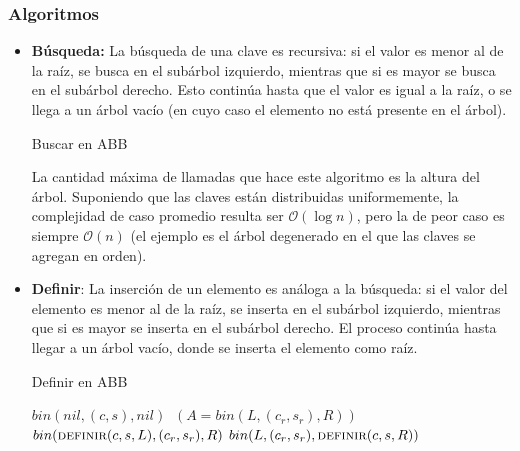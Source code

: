 \documentclass{article}
\newcommand{\BigO}[1]{{\mathcal{O}(#1)}}
\begin{document}
\subsubsection{Algoritmos}

\begin{itemize}
    \item \textbf{Búsqueda:} La búsqueda de una clave es recursiva: si el valor es menor al de la raíz, se busca en el subárbol izquierdo, mientras que si es mayor se busca en el subárbol derecho. Esto continúa hasta que el valor es igual a la raíz, o se llega a un árbol vacío (en cuyo caso el elemento no está presente en el árbol).
          \begin{algorithm}[H]
              \caption*{Buscar en ABB}\label{alg-abb-buscar}

          \end{algorithm}

          La cantidad máxima de llamadas que hace este algoritmo es la altura del árbol. Suponiendo que las claves están distribuidas uniformemente, la complejidad de caso promedio resulta ser $\BigO{}$, pero la de peor caso es siempre $\BigO{n}$ (el ejemplo es el árbol degenerado en el que las claves se agregan en orden).

    \item \textbf{Definir}: La inserción de un elemento es análoga a la búsqueda: si el valor del elemento es menor al de la raíz, se inserta en el subárbol izquierdo, mientras que si es mayor se inserta en el subárbol derecho. El proceso continúa hasta llegar a un árbol vacío, donde se inserta el elemento como raíz.
          \begin{algorithm}[H]
              \caption*{Definir en ABB}\label{alg-abb-definir}
              \begin{algorithmic}
                  \State \Return $bin(nil, (c, s), nil)$
                  \Else
                  $\ (A = bin(L, (c_r, s_r), R))$
                  \State \Return $bin(\textsc{definir}(c, s, L), (c_r, s_r), R)$
                  \Else
                  \State \Return $bin(L, (c_r, s_r), \textsc{definir}(c, s, R))$
                  \EndIf
                  \EndIf
                  \EndFunction
              \end{algorithmic}
          \end{algorithm}


\end{itemize}
\end{document}
